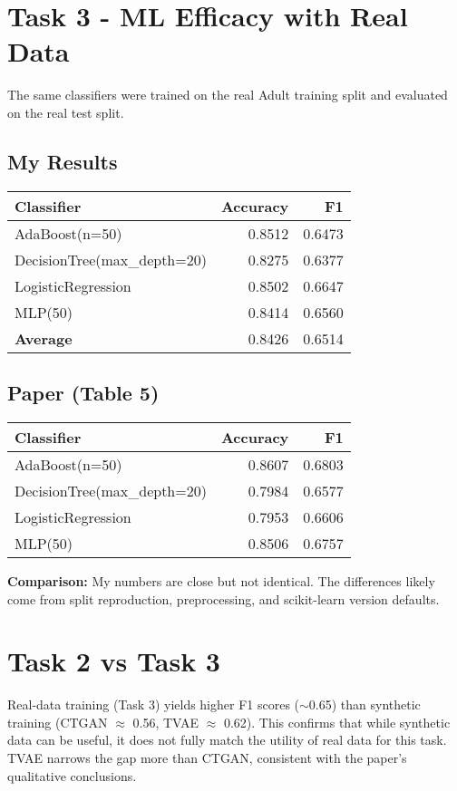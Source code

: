 \documentclass[12pt]{article}
\begin{document}
\section*{Task 3 - ML Efficacy with Real Data}
The same classifiers were trained on the real Adult training split and evaluated on the real test split.

\subsection*{My Results}
\begin{tabular}{l r r}
\toprule
Classifier & Accuracy & F1 \\
\midrule
AdaBoost(n=50)              & 0.8512 & 0.6473 \\
DecisionTree(max\_depth=20) & 0.8275 & 0.6377 \\
LogisticRegression          & 0.8502 & 0.6647 \\
MLP(50)                     & 0.8414 & 0.6560 \\
\midrule
\textbf{Average}            & 0.8426 & 0.6514 \\
\bottomrule
\end{tabular}

\subsection*{Paper (Table 5)}
\begin{tabular}{l r r}
\toprule
Classifier & Accuracy & F1 \\
\midrule
AdaBoost(n=50)              & 0.8607 & 0.6803 \\
DecisionTree(max\_depth=20) & 0.7984 & 0.6577 \\
LogisticRegression          & 0.7953 & 0.6606 \\
MLP(50)                     & 0.8506 & 0.6757 \\
\bottomrule
\end{tabular}

\vspace{10pt}
\noindent \textbf{Comparison:} My numbers are close but not identical. The differences likely come from split reproduction, preprocessing, and scikit-learn version defaults.

\section*{Task 2 vs Task 3}
Real-data training (Task 3) yields higher F1 scores ($\sim$0.65) than synthetic training (CTGAN $\approx$ 0.56, TVAE $\approx$ 0.62). This confirms that while synthetic data can be useful, it does not fully match the utility of real data for this task. TVAE narrows the gap more than CTGAN, consistent with the paper's qualitative conclusions.
\end{document}
